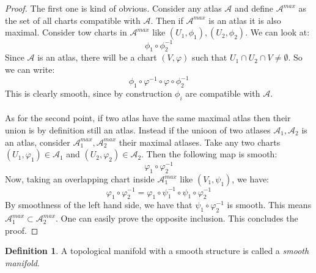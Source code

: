 \documentclass[12pt,a4paper]{report}
\theoremstyle{definition}
\newtheorem{Def}{Definition}[chapter]
\theoremstyle{Theorem}
\theoremstyle{definition}
\theoremstyle{definition}
\begin{document}
		\begin{proof}
			The first one is kind of obvious. Consider any atlas $\mathcal{A}$ and define $\mathcal{A}^{max}$ as the set of all charts compatible with $\mathcal{A}$. Then if $\mathcal{A}^{max}$ is an atlas it is also maximal. Consider tow charts in $\mathcal{A}^{max}$ like $(U_1,\phi_1),(U_2,\phi_2)$. We can look at:
			$$\phi_1\circ \phi_2^{-1}$$
			Since $\mathcal{A}$ is an atlas, there will be a chart $(V,\varphi)$ such that $U_1\cap U_2\cap V\neq \emptyset$. So we can write:
			$$\phi_1\circ \varphi^{-1}\circ \varphi\circ \phi_2^{-1}$$
			This is clearly smooth, since by construction $\phi_i$ are compatible with $\mathcal{A}$.\\
			\\
			As for the second point, if two atlas have the same maximal atlas then their union is by definition still an atlas. Instead if the unioon of two atlases $\mathcal{A}_1,\mathcal{A}_2$ is an atlas, consider $\mathcal{A}^{max}_1,\mathcal{A}^{max}_2$ their maximal atlases. Take any two charts $(U_1,\varphi_1)\in\mathcal{A}_1$ and $(U_2,\varphi_2)\in\mathcal{A}_2$. Then the following map is smooth:
			$$\varphi_1\circ \varphi_2^{-1}$$
			Now, taking an overlapping chart inside $\mathcal{A}_1^{max}$ like $(V_1,\psi_1)$, we have:
			$$\varphi_1\circ \varphi_2^{-1}=\varphi_1\circ \psi_1^{-1}\circ \psi_1\circ \varphi_2^{-1}$$
			By smoothness of the left hand side, we have that $\psi_1\circ \varphi_2^{-1}$ is smooth. This means $\mathcal{A}_1^{max}\subset \mathcal{A}_2^{max}$. One can easily prove the opposite inclusion. This concludes the proof.
		\end{proof}
		\begin{Def}
			A topological manifold with a smooth structure is called a \textit{smooth manifold}.
		\end{Def}
\end{document}
